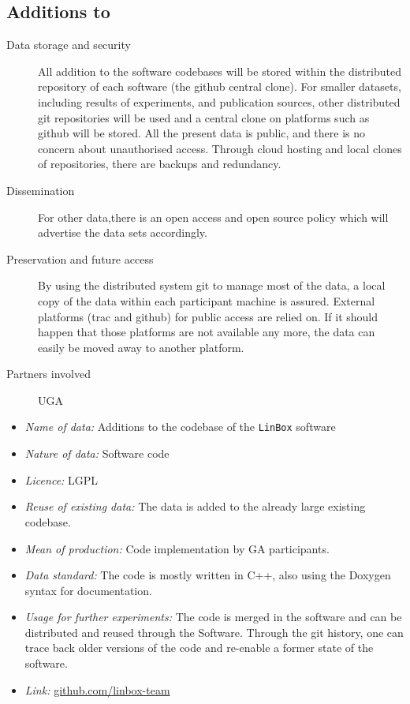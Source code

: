 \documentclass{deliverablereport}
\begin{document}
\begin{enumerate}
\subsection{Additions to \Linbox}

\begin{description}
\item[Data storage and security] All addition to the software codebases will be stored within the distributed repository of each software (the github central clone). For smaller datasets, including results of experiments, and publication sources, other distributed git repositories will be used and a central clone on platforms such as github will be stored. All the present data is public, and there is no concern about unauthorised access. Through cloud hosting and local clones of repositories, there are backups and redundancy.
\item[Dissemination] For other data,there is an open access and open source policy which will advertise the data sets accordingly.
\item[Preservation and future access] By using the distributed system git to manage most of the data, a local copy of the data within each participant machine is assured. External platforms (trac and github) for public access are relied on. If it should happen that those platforms are not available any more, the data can easily be moved away to another platform.
\item[Partners involved] UGA
\end{description}

\begin{itemize}
\item\textit{Name of data:} Additions to the codebase of the \texttt{LinBox} software
\item\textit{Nature of data:} Software code
\item\textit{Licence:} LGPL
\item\textit{Reuse of existing data:} The data is added to the already large existing codebase.
\item\textit{Mean of production:} Code implementation by GA participants.
\item\textit{Data standard:} The code is mostly written in C++, also using the Doxygen syntax for documentation.
\item\textit{Usage for further experiments:} The code is merged in the software and can be distributed and reused through the Software. Through the git history,
one can trace back older versions of the code and re-enable a former state of the software.
\item\textit{Link:} \href{https://github.com/linbox-team}{github.com/linbox-team}
\end{itemize}




\end{enumerate}
\end{document}

